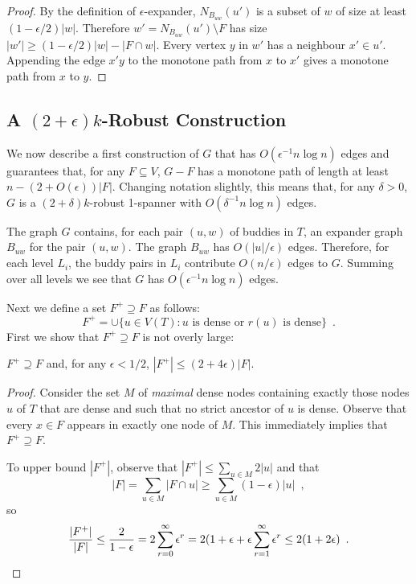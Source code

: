 \documentclass{patmorin}
\begin{document}
\begin{proof}
  By the definition of $\epsilon$-expander, $N_{B_{uw}}(u')$ is a
  subset of $w$ of size at least $(1-\epsilon/2)|w|$. Therefore
  $w'=N_{B_{uw}}(u')\setminus F$ has size $|w'|\ge
  (1-\epsilon/2)|w|-|F\cap w|$.  Every vertex $y$ in $w'$ has a neighbour
  $x'\in u'$. Appending the edge $x'y$ to the monotone path from $x$
  to $x'$ gives a monotone path from $x$ to $y$.
\end{proof}
   
	
\subsection{A $(2+\epsilon)k$-Robust Construction}

We now describe a first construction of $G$ that has $O(\epsilon^{-1}n\log
n)$ edges and guarantees that, for any $F\subseteq V$,  $G-F$ has a
monotone path of length at least $n-(2+O(\epsilon))|F|$.  Changing
notation slightly, this means that, for any $\delta >0$, $G$ is a
$(2+\delta)k$-robust 1-spanner with $O(\delta^{-1}n\log n)$ edges.

The graph $G$ contains, for each pair $(u,w)$ of buddies in $T$, an
expander graph $B_{uw}$ for the pair $(u,w)$.  The graph $B_{uw}$ has $O(|u|/\epsilon)$ edges. Therefore, for each level $L_i$, the buddy pairs in $L_i$ contribute $O(n/\epsilon)$ edges to $G$.  Summing over all levels we see that $G$ has $O(\epsilon^{-1}n\log n)$ edges.

Next we define a set $F^+\supseteq F$ as follows: 
\[
	F^+ = \cup\{ u\in V(T): \text{$u$ is dense or $r(u)$ is dense}\} \enspace .
\]
First we show that $F^+\supseteq F$ is not overly large:

\begin{clm}
  $F^+\supseteq F$ and, for any $\epsilon < 1/2$, $|F^+|\le (2+4\epsilon)|F|$.
\end{clm}

\begin{proof}
  Consider the set $M$ of \emph{maximal} dense nodes containing exactly
  those nodes $u$ of $T$ that are dense and such that no strict ancestor
  of $u$ is dense.  Observe that every $x\in F$ appears in exactly one
  node of $M$.  This immediately implies that $F^+\supseteq F$.

  To upper bound $|F^+|$, observe that $|F^+| \le \sum_{u\in M} 2|u|$
  and that 
  \[ 
     |F| = \sum_{u\in M} |F\cap u| \ge \sum_{u\in M} (1-\epsilon)|u| \enspace , 
  \]
	so
  \[
    \frac{|F^+|}{|F|} 
      \le \frac{2}{1-\epsilon} 
	= 2\sum_{r=0}^\infty\epsilon^r 
	= 2(1+\epsilon + \epsilon\sum_{r=1}^\infty \epsilon^r 
	\le 2(1+2\epsilon) \enspace . \qedhere
  \]
\end{proof}
\end{document}

